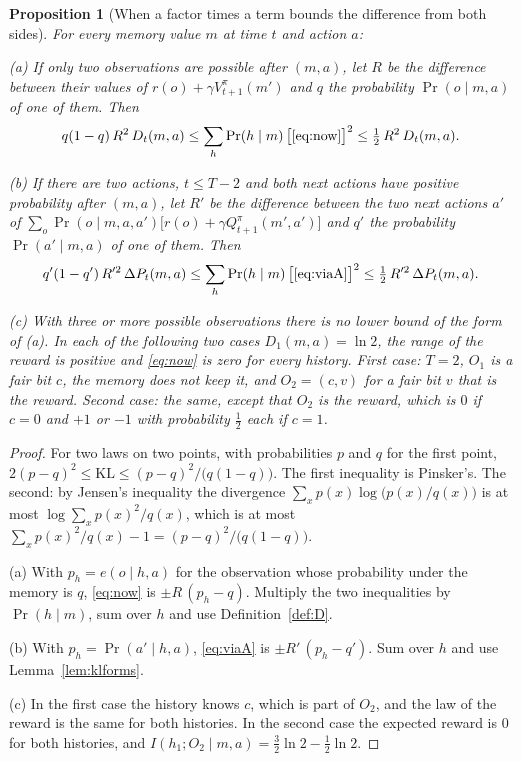 \documentclass{article}
\newtheorem{proposition}{Proposition}[section]
\theoremstyle{definition}
\newcommand{\KL}{\mathrm{KL}}
\newcommand{\dP}{\Delta P}
\begin{document}
\begin{proposition}[When a factor times a term bounds the difference from both sides]\label{prop:twosided}
For every memory value $m$ at time $t$ and action $a$:

(a) If only two observations are possible after $(m,a)$, let $R$ be the difference between their values of $r(o)+\gamma V^\pi_{t+1}(m')$ and $q$ the probability $\Pr(o\mid m,a)$ of one of them. Then
\[
q(1-q)\,R^2\,D_t(m,a)\le\sum_h\Pr(h\mid m)\,\big[\eqref{eq:now}\big]^2\le\tfrac12\,R^2\,D_t(m,a).
\]

(b) If there are two actions, $t\le T-2$ and both next actions have positive probability after $(m,a)$, let $R'$ be the difference between the two next actions $a'$ of $\sum_o\Pr(o\mid m,a,a')\big[r(o)+\gamma Q^\pi_{t+1}(m',a')\big]$ and $q'$ the probability $\Pr(a'\mid m,a)$ of one of them. Then
\[
q'(1-q')\,R'^2\,\dP_t(m,a)\le\sum_h\Pr(h\mid m)\,\big[\eqref{eq:viaA}\big]^2\le\tfrac12\,R'^2\,\dP_t(m,a).
\]

(c) With three or more possible observations there is no lower bound of the form of (a). In each of the following two cases $D_1(m,a)=\ln2$, the range of the reward is positive and \eqref{eq:now} is zero for every history. First case: $T=2$, $O_1$ is a fair bit $c$, the memory does not keep it, and $O_2=(c,v)$ for a fair bit $v$ that is the reward. Second case: the same, except that $O_2$ is the reward, which is $0$ if $c=0$ and $+1$ or $-1$ with probability $\tfrac12$ each if $c=1$.
\end{proposition}

\begin{proof}
For two laws on two points, with probabilities $p$ and $q$ for the first point, $2(p-q)^2\le\KL\le(p-q)^2/\big(q(1-q)\big)$. The first inequality is Pinsker's. The second: by Jensen's inequality the divergence $\sum_xp(x)\log\big(p(x)/q(x)\big)$ is at most $\log\sum_xp(x)^2/q(x)$, which is at most $\sum_xp(x)^2/q(x)-1=(p-q)^2/\big(q(1-q)\big)$.

(a) With $p_h=e(o\mid h,a)$ for the observation whose probability under the memory is $q$, \eqref{eq:now} is $\pm R\,(p_h-q)$. Multiply the two inequalities by $\Pr(h\mid m)$, sum over $h$ and use Definition~\ref{def:D}.

(b) With $p_h=\Pr(a'\mid h,a)$, \eqref{eq:viaA} is $\pm R'\,(p_h-q')$. Sum over $h$ and use Lemma~\ref{lem:klforms}.

(c) In the first case the history knows $c$, which is part of $O_2$, and the law of the reward is the same for both histories. In the second case the expected reward is $0$ for both histories, and $I(h_1;O_2\mid m,a)=\tfrac32\ln2-\tfrac12\ln2$.
\end{proof}
\end{document}
